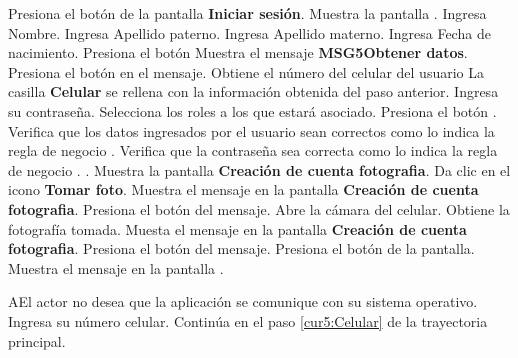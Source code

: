  \begin{UCtrayectoria}
 	
	 \UCpaso [\UCactor] Presiona el botón  de la pantalla \textbf{Iniciar sesión}.
	 \UCpaso Muestra la pantalla .
	 \UCpaso [\UCactor] Ingresa Nombre.
	 \UCpaso [\UCactor] Ingresa Apellido paterno.
	 \UCpaso [\UCactor] Ingresa Apellido materno.
	 \UCpaso [\UCactor] Ingresa Fecha de nacimiento.
	 \UCpaso [\UCactor] Presiona el botón  
	 \UCpaso Muestra el mensaje \textbf{MSG5{Obtener datos}}.
	 \UCpaso [\UCactor] Presiona el botón  en el mensaje.
	 \UCpaso Obtiene el número del celular del usuario
	 \UCpaso La casilla \textbf{Celular} se rellena con la información obtenida del paso anterior.
	 \UCpaso [\UCactor] Ingresa su contraseña.\label{cur5:Celular}
	 \UCpaso [\UCactor] Selecciona los roles a los que estará asociado.
	 \UCpaso [\UCactor] Presiona el botón . \label{cur3:Doctor}
	 \UCpaso Verifica que los datos ingresados por el usuario sean correctos como lo indica la regla de negocio . 
	 \UCpaso Verifica que la contraseña sea correcta como lo indica la regla de negocio . .
	 \UCpaso Muestra la pantalla \textbf{Creación de cuenta fotografia}.
	 \UCpaso [\UCactor] Da clic en el icono \textbf{Tomar foto}. 
	 \UCpaso Muestra el mensaje  en la pantalla \textbf{Creación de cuenta fotografia}.
	 \UCpaso [\UCactor] Presiona el botón  del mensaje.
	 \UCpaso Abre la cámara del celular.
	 \UCpaso Obtiene la fotografía tomada.
	 \UCpaso Muesta el mensaje  en la pantalla \textbf{Creación de cuenta fotografia}.
	 \UCpaso [\UCactor] Presiona el botón  del mensaje.
	 \UCpaso [\UCactor] Presiona el botón  de la pantalla.\label{cur3:foto}
	 \UCpaso Muestra el mensaje  en la pantalla .
	 

 \end{UCtrayectoria}

 \begin{UCtrayectoriaA}{A}{El actor no desea que la aplicación se comunique con su sistema operativo.}
 	\UCpaso [\UCactor] Ingresa su número celular.
 	\UCpaso Continúa en el paso \ref{cur5:Celular} de la trayectoria principal.
    
 \end{UCtrayectoriaA}
 
